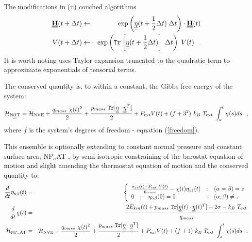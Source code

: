 The modifications in (ii)
couched algorithms
\begin{eqnarray}
\mbox{$\underline{\underline{\bf H}}$}(t + \Delta t) &\leftarrow& \exp \left( \mbox{$\underline{\underline{\bf \eta}}$}(t + {1 \over 2} \Delta t) \;
\Delta t \right) \cdot \mbox{$\underline{\underline{\bf H}}$}(t) \nonumber \\
V(t + \Delta t) &\leftarrow& \exp \left({\tt Tr}
\left[ \mbox{$\underline{\underline{\bf \eta}}$}(t + {1 \over 2} \Delta t) \right] \; \Delta t \right) \; V(t)~~.
\end{eqnarray}
It is worth noting \D uses Taylor expansion truncated to the
quadratic term to approximate exponentials of tensorial terms.

The conserved quantity is, to within a constant, the Gibbs free energy
of the system:
\begin{equation}
{\cal H}_{\rm N\mbox{$\underline{\underline{\bf \sigma}}$}T} = {\cal H}_{\rm NVE} + {q_{mass}~\chi (t)^{2} \over 2} +
{p_{mass}~{\tt Tr}[\mbox{$\underline{\underline{\bf \eta}}$} \cdot \mbox{$\underline{\underline{\bf \eta}}$}^{T}] \over 2} + P_{\rm ext} V(t) +
(f+3^{2})~k_{B}~T_{\rm ext}~\int_o^t \chi (s) ds~~,
\end{equation}
where $f$ is the system's degrees of freedom - equation
(\ref{freedom}).

This ensemble is optionally extending to constant normal pressure
and constant surface area, NP$_{n}$AT \cite{ikeguchi-04a}, by semi-isotropic
constraining of the barostat equation of motion and slight amending
the thermostat equation of motion and the conserved quantity to:
\begin{eqnarray}
\frac{d}{dt} \eta_{\alpha\beta}(t) &=& \left\{ \begin{array} {l@{\quad:\quad}l}
\frac{\sigma_{zz}(t) - P_{\rm ext}~V(t)}{p_{mass}} -
\chi(t) \eta_{zz}(t) & (\alpha = \beta) = z \\
0~~~;~~~\eta_{\alpha\beta}(0) = 0 & (\alpha,\beta) \ne z
\end{array} \right. \nonumber \\
\frac{d}{dt} \chi(t) &=& \frac{2 E_{kin}(t) + p_{mass}~{\tt Tr}[\mat{\eta}(t) \cdot
\mat{\eta}(t)^{T}] - 2 \sigma - k_{B}~T_{\rm ext}}{q_{mass}} \\
{\cal H}_{\rm NP_{n}AT} &=& {\cal H}_{\rm NVE} + {q_{mass}~\chi (t)^{2} \over 2} +
{p_{mass}~{\tt Tr}[\mat{\eta} \cdot \mat{\eta}^{T}] \over 2} + P_{\rm ext} V(t) +
(f+1)~k_{B}~T_{\rm ext}~\int_o^t \chi (s) ds~~. \nonumber
\end{eqnarray}


